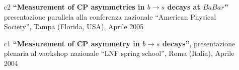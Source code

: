 \documentclass[11pt,twoside,a4paper]{article}
\begin{document}
\begin{enumerate}
\item[c2] {\bf ``Measurement of CP asymmetries in $b \rightarrow s$
  decays at $BaBar$''} presentazione parallela alla conferenza
  nazionale ``American Physical Society'', Tampa (Florida, USA),
  Aprile 2005
  \vspace{2mm}

\item[c1] {\bf ``Measurement of CP asymmetry in $b \rightarrow s$
  decays''}, presentazione plenaria al workshop nazionale ``LNF spring
  school'', Roma (Italia), Aprile 2004
  \vspace{2mm}

\end{enumerate}

  
\end{document}
